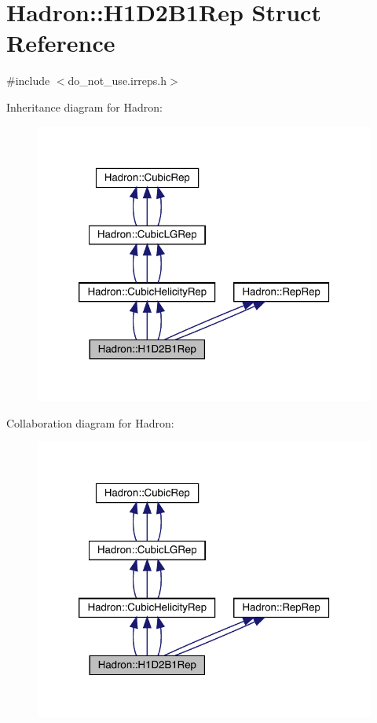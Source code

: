 \hypertarget{structHadron_1_1H1D2B1Rep}{}\section{Hadron\+:\+:H1\+D2\+B1\+Rep Struct Reference}
\label{structHadron_1_1H1D2B1Rep}


{\ttfamily \#include $<$do\+\_\+not\+\_\+use.\+irreps.\+h$>$}



Inheritance diagram for Hadron\+:
\nopagebreak
\begin{figure}[H]
\begin{center}
\leavevmode
\includegraphics[width=320pt]{db/dc9/structHadron_1_1H1D2B1Rep__inherit__graph}
\end{center}
\end{figure}


Collaboration diagram for Hadron\+:
\nopagebreak
\begin{figure}[H]
\begin{center}
\leavevmode
\includegraphics[width=320pt]{de/d57/structHadron_1_1H1D2B1Rep__coll__graph}
\end{center}
\end{figure}
